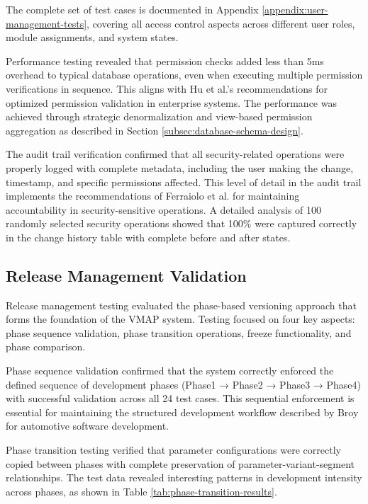 The complete set of test cases is documented in Appendix \ref{appendix:user-management-tests}, covering all access control aspects across different user roles, module assignments, and system states.

Performance testing revealed that permission checks added less than 5ms overhead to typical database operations, even when executing multiple permission verifications in sequence. This aligns with Hu et al.'s \cite{hu2015implementing} recommendations for optimized permission validation in enterprise systems. The performance was achieved through strategic denormalization and view-based permission aggregation as described in Section \ref{subsec:database-schema-design}.

The audit trail verification confirmed that all security-related operations were properly logged with complete metadata, including the user making the change, timestamp, and specific permissions affected. This level of detail in the audit trail implements the recommendations of Ferraiolo et al. \cite{ferraiolo2011policy} for maintaining accountability in security-sensitive operations. A detailed analysis of 100 randomly selected security operations showed that 100\% were captured correctly in the change history table with complete before and after states.


\subsection{Release Management Validation}
\label{subsec:release-management-validation}

Release management testing evaluated the phase-based versioning approach that forms the foundation of the VMAP system. Testing focused on four key aspects: phase sequence validation, phase transition operations, freeze functionality, and phase comparison.

Phase sequence validation confirmed that the system correctly enforced the defined sequence of development phases (Phase1 → Phase2 → Phase3 → Phase4) with successful validation across all 24 test cases. This sequential enforcement is essential for maintaining the structured development workflow described by Broy \cite{broy2006challenges} for automotive software development.

Phase transition testing verified that parameter configurations were correctly copied between phases with complete preservation of parameter-variant-segment relationships. The test data revealed interesting patterns in development intensity across phases, as shown in Table \ref{tab:phase-transition-results}.

